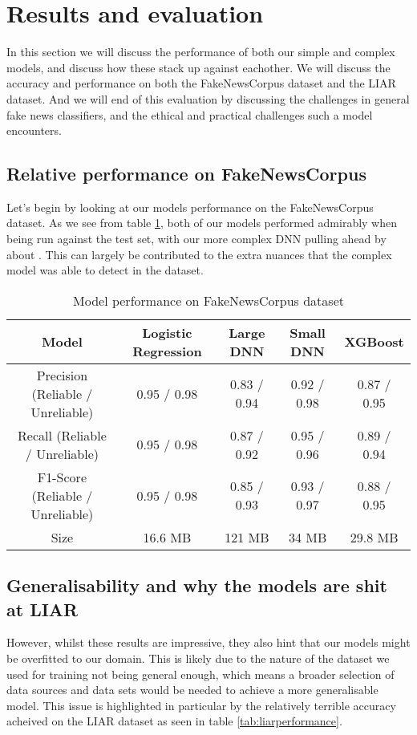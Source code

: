 \section{Results and evaluation}
In this section we will discuss the performance of both our simple and complex models, and discuss how these stack up
against eachother. We will discuss the accuracy and performance on both the FakeNewsCorpus dataset and the LIAR
dataset. And we will end of this evaluation by discussing the challenges in general fake news classifiers, and the
ethical and practical challenges such a model encounters.

\subsection{Relative performance on FakeNewsCorpus}
Let's begin by looking at our models performance on the FakeNewsCorpus dataset. As we see from table \ref{tab:fakenewsperformance},
both of our models performed admirably when being run against the test set, with our more complex DNN pulling ahead by
about . This can largely be contributed to the extra nuances that the complex model was able to detect in
the dataset.

\begin{table}[htpb]
  \centering
  \caption{Model performance on FakeNewsCorpus dataset}
  \label{tab:fakenewsperformance}

  \begin{tabular}{c|cccc}
    Model & Logistic Regression & Large DNN & Small DNN & XGBoost \\ \hline
    Precision (Reliable / Unreliable) & 0.95 / 0.98 & 0.83 / 0.94 & 0.92 / 0.98 & 0.87 / 0.95 \\ \hline
    Recall (Reliable / Unreliable) & 0.95 / 0.98 & 0.87 / 0.92 & 0.95 / 0.96 & 0.89 / 0.94 \\ \hline
    F1-Score (Reliable / Unreliable) & 0.95 / 0.98 & 0.85 / 0.93 & 0.93 / 0.97 & 0.88 / 0.95 \\ \hline
    Size & 16.6 MB & 121 MB & 34 MB & 29.8 MB 
  \end{tabular}
\end{table}

\subsection{Generalisability and why the models are shit at LIAR}
However, whilst these results are impressive, they also hint that our models might be overfitted to our domain. This is
likely due to the nature of the dataset we used for training not being general enough, which means a broader selection
of data sources and data sets would be needed to achieve a more generalisable model. This issue is highlighted in
particular by the relatively terrible accuracy acheived on the LIAR dataset as seen in table \ref{tab:liarperformance}.

